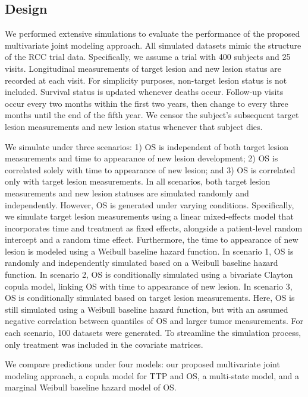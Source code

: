 \documentclass[aoas]{imsart}
\theoremstyle{plain}
\theoremstyle{remark}
\begin{document}
\subsection{Design}
We performed extensive simulations to evaluate the performance of the proposed multivariate joint modeling approach. All simulated datasets mimic the structure of the RCC trial data. Specifically, we assume a trial with 400 subjects and 25 visits. Longitudinal measurements of target lesion and new lesion status are recorded at each visit. For simplicity purposes, non-target lesion status is not included. Survival status is updated whenever deaths occur. Follow-up visits occur every two months within the first two years, then change to every three months until the end of the fifth year. We censor the subject's subsequent target lesion measurements and new lesion status whenever that subject dies. 

We simulate under three scenarios: 1) OS is independent of both target lesion measurements and time to appearance of new lesion development; 2) OS is correlated solely with time to appearance of new lesion; and 3) OS is correlated only with target lesion measurements. In all scenarios, both target lesion measurements and new lesion statuses are simulated randomly and independently. However, OS is generated under varying conditions. Specifically, we simulate target lesion measurements using a linear mixed-effects model that incorporates time and treatment as fixed effects, alongside a patient-level random intercept and a random time effect. Furthermore, the time to appearance of new lesion is modeled using a Weibull baseline hazard function. In scenario 1, OS is randomly and independently simulated based on a Weibull baseline hazard function. In scenario 2, OS is conditionally simulated using a bivariate Clayton copula model, linking OS with time to appearance of new lesion. In scenario 3, OS is conditionally simulated based on target lesion measurements. Here, OS is still simulated using a Weibull baseline hazard function, but with an assumed negative correlation between quantiles of OS and larger tumor measurements. For each scenario, 100 datasets were generated. To streamline the simulation process, only treatment was included in the covariate matrices.

We compare predictions under four models: our proposed multivariate joint modeling approach, a copula model for TTP and OS, a multi-state model, and a marginal Weibull baseline hazard model of OS. 
\end{document}
